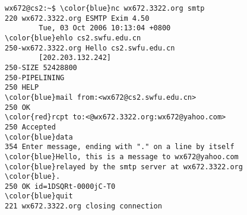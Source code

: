 \documentclass[varwidth=28.5em,crop]{standalone}
\begin{document}
\pagestyle{empty}

\begin{Verbatim}[commandchars=\\\{\}]
wx672@cs2:~$ \color{blue}nc wx672.3322.org smtp
220 wx672.3322.org ESMTP Exim 4.50
        Tue, 03 Oct 2006 10:13:04 +0800
\color{blue}ehlo cs2.swfu.edu.cn
250-wx672.3322.org Hello cs2.swfu.edu.cn
        [202.203.132.242]
250-SIZE 52428800
250-PIPELINING
250 HELP
\color{blue}mail from:<wx672@cs2.swfu.edu.cn>
250 OK
\color{red}rcpt to:<@wx672.3322.org:wx672@yahoo.com>
250 Accepted
\color{blue}data
354 Enter message, ending with "." on a line by itself
\color{blue}Hello, this is a message to wx672@yahoo.com
\color{blue}relayed by the smtp server at wx672.3322.org
\color{blue}.
250 OK id=1DSQRt-0000jC-T0
\color{blue}quit
221 wx672.3322.org closing connection
\end{Verbatim}
\end{document}
